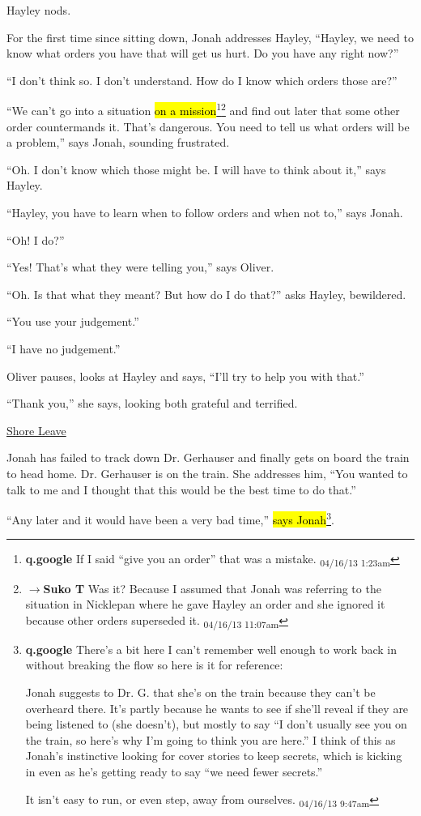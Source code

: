 Hayley nods.



For the first time since sitting down, Jonah addresses Hayley, ``Hayley, we need to know what orders you have that will get us hurt.  Do you have any right now?''

``I don't think so.  I don't understand.  How do I know which orders those are?''

``We can't go into a situation \hl{on a mission}\footnote{\textbf{q.google }If I said ``give you an order'' that was a mistake. \textsubscript{04/16/13 1:23am}}\footnote{$\rightarrow$\textbf{Suko T }Was it?  Because I assumed that Jonah was referring to the situation in Nicklepan where he gave Hayley an order and she ignored it because other orders superseded it. \textsubscript{04/16/13 11:07am}} and find out later that some other order countermands it.  That's dangerous.  You need to tell us what orders will be a problem,'' says Jonah, sounding frustrated.

``Oh.  I don't know which those might be.  I will have to think about it,'' says Hayley.

``Hayley, you have to learn when to follow orders and when not to,'' says Jonah.

``Oh!  I do?''

``Yes!  That's what they were telling you,'' says Oliver.

``Oh.  Is that what they meant?  But how do I do that?'' asks Hayley, bewildered.

``You use your judgement.''

``I have no judgement.''

Oliver pauses, looks at Hayley and says, ``I'll try to help you with that.''

``Thank you,'' she says, looking both grateful and terrified.



\underline{  {\LARGE Shore Leave }  }



Jonah has failed to track down Dr. Gerhauser and finally gets on board the train to head home.  Dr. Gerhauser is on the train.  She addresses him, ``You wanted to talk to me and I thought that this would be the best time to do that.''

``Any later and it would have been a very bad time,'' \hl{says Jonah}\footnote{\textbf{q.google }There's a bit here I can't remember well enough to work back in without breaking the flow so here is it for reference:

Jonah suggests to Dr. G. that she's on the train because they can't be overheard there.  It's partly because he wants to see if she'll reveal if they are being listened to (she doesn't), but mostly to say ``I don't usually see you on the train, so here's why I'm going to think you are here.''  I think of this as Jonah's instinctive looking for cover stories to keep secrets, which is kicking in even as he's getting ready to say ``we need fewer secrets.''

It isn't easy to run, or even step, away from ourselves. \textsubscript{04/16/13 9:47am}}.

